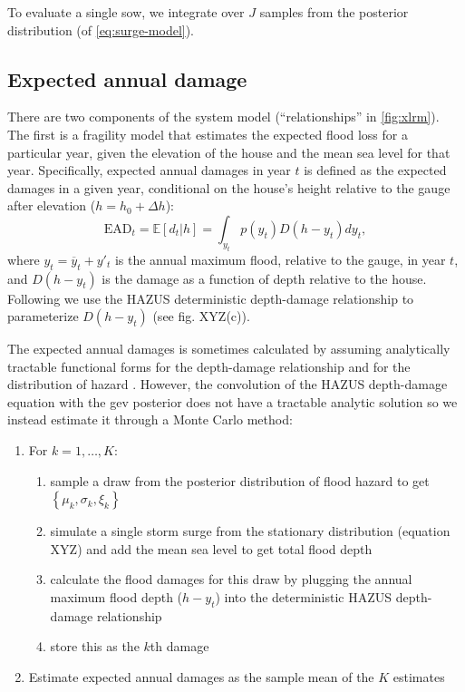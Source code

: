 \documentclass[12pt]{article}
\makeatletter
\newcommand{\james}[1]{\todo[color=giallo, textcolor=nero]{\textbf{ATTN James:~}#1}} %
\DeclareRobustCommand\onedot{\futurelet\@let@token\@onedot}
\def\@onedot{\ifx\@let@token.\else.\null\fi\xspace}
\def\eg{\emph{e.g}\onedot} \def\Eg{\emph{E.g}\onedot}
\DeclareRobustCommand\onedot{\futurelet\@let@token\@onedot}
\def\@onedot{\ifx\@let@token.\else.\null\fi\xspace}
\def\eg{\emph{e.g}\onedot} \def\Eg{\emph{E.g}\onedot}
\makeatother
\begin{document}
To evaluate a single \gls{sow}, we integrate over $J$ samples from the posterior distribution (of \cref{eq:surge-model}).

\subsection{Expected annual damage}\label{sec:ead}

There are two components of the system model (``relationships'' in \cref{fig:xlrm}).
The first is a fragility model that estimates the expected flood loss for a particular year, given the elevation of the house and the mean sea level for that year.
Specifically, expected annual damages in year $t$ is defined as the expected damages in a given year, conditional on the house's height relative to the gauge after elevation ($h = h_0 + \Delta h$):
\begin{equation}
    \textrm{EAD}_t = \mathbb{E}[d_t | h] = \int_{y_t} p(y_t) D(h - y_t) dy_t,
\end{equation}
where $y_t = \overline{y}_t + y'_t$ is the annual maximum flood, relative to the gauge, in year $t$, and $D(h - y_t)$ is the damage as a function of depth relative to the house.
Following \citet{zarekarizi_suboptimal:2020} we use the HAZUS deterministic depth-damage relationship to parameterize $D(h-y_t)$ (see fig. XYZ(c)).\james{Cite HAZUS}

The expected annual damages is sometimes calculated by assuming analytically tractable functional forms for the depth-damage relationship and for the  distribution of hazard \citep[\eg][]{vandantzig_dike:1956}.
However, the convolution of the HAZUS depth-damage equation with the \gls{gev} posterior does not have a tractable analytic solution so we instead estimate it through a Monte Carlo method:
\begin{enumerate}
    \item For $k=1, \ldots, K$:
          \begin{enumerate}
              \item sample a draw from the posterior distribution of flood hazard to get $\left\{ \mu_k, \sigma_k, \xi_k \right\}$
              \item simulate a single storm surge from the stationary distribution (equation XYZ) and add the mean sea level to get total flood depth
              \item calculate the flood damages for this draw by plugging the annual maximum flood depth ($h - y_t$) into  the deterministic HAZUS depth-damage relationship
              \item store this as the $k$th damage
          \end{enumerate}
    \item Estimate expected annual damages as the sample mean of the $K$ estimates
\end{enumerate}
\end{document}

